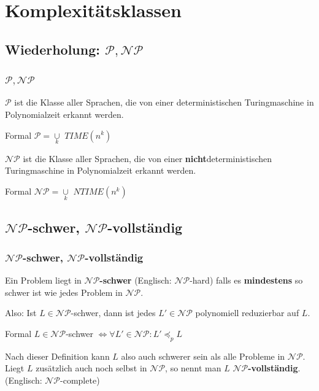 




\section{Komplexitätsklassen}
\subsection{Wiederholung: $\mathcal{P}, \mathcal{NP}$}
\begin{frame}
	\frametitle{$\mathcal{P}, \mathcal{NP}$}
	
	$\mathcal{P}$ ist die Klasse aller Sprachen, die von einer deterministischen Turingmaschine in Polynomialzeit erkannt werden.
	\begin{block}{Formal}
		$\mathcal{P} = \underset{k}{\cup}$ $TIME(n^k)$
	\end{block}
	
	$\mathcal{NP}$ ist die Klasse aller Sprachen, die von einer \textbf{nicht}deterministischen Turingmaschine in Polynomialzeit erkannt werden.
	\begin{block}{Formal}
		$\mathcal{NP} = \underset{k}{\cup}$ $NTIME(n^k)$
	\end{block}
\end{frame}

\subsection{$\mathcal{NP}$-schwer, $\mathcal{NP}$-vollständig}
\begin{frame}
	\frametitle{$\mathcal{NP}$-schwer, $\mathcal{NP}$-vollständig}
	Ein Problem liegt in \textbf{$\mathcal{NP}$-schwer} (Englisch: $\mathcal{NP}$-hard) falls es \textbf{mindestens} so schwer ist wie jedes Problem in $\mathcal{NP}$.
	
	Also: Ist $L \in \mathcal{NP}$-schwer, dann ist jedes $L' \in \mathcal{NP}$ polynomiell reduzierbar auf $L$.
	
	\begin{block}{Formal}
		$L \in \mathcal{NP}$-schwer $\Leftrightarrow \forall L' \in \mathcal{NP}: L' \preceq_p L$
	\end{block}
	
	Nach dieser Definition kann $L$ also auch schwerer sein als alle Probleme in $\mathcal{NP}$. Liegt $L$ zusätzlich auch noch selbst in $\mathcal{NP}$, so nennt man $L$ \textbf{$\mathcal{NP}$-vollständig}. (Englisch: $\mathcal{NP}$-complete)
\end{frame}

